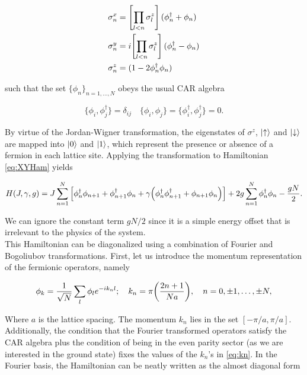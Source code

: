 \begin{align}
\sigma_n^x &= \qty[\prod_{l<n}\sigma^z_l](\phi_n^\dagger + \phi_n)\nonumber\\
\sigma_n^y &= i\qty[\prod_{l<n}\sigma^z_l](\phi_n^\dagger - \phi_n)\\
\sigma_n^z &= (1-2\phi_n^\dagger \phi_n )\nonumber
\end{align}


such that the set $\{\phi_n\}_{n=1,\ldots,N}$ obeys the usual CAR algebra

\begin{equation}
\{\phi_i, \phi_j^\dagger\}= \delta_{ij} \quad \{\phi_i, \phi_j\}=\{\phi_i^\dagger, \phi_j^\dagger\}=0.
\end{equation}

By virtue of the Jordan-Wigner transformation, the eigenstates of $\sigma^z$, $\ket{\uparrow}$ and $\ket{\downarrow}$ are mapped into $\ket{0}$ and $\ket{1}$, which represent the presence or absence of a fermion in each lattice site. Applying the transformation to Hamiltonian \eqref{eq:XYHam} yields

\begin{equation}
    H(J,\gamma,g) = J\sum_{n=1}^{N}\qty[\phi^\dagger_n  \phi_{n+1} + \phi^\dagger_{n+1}\phi_n + \gamma\qty(\phi_n^\dagger\phi^\dagger_{n+1} + \phi_{n+1}\phi_n)] + 2g\sum_{n=1}^{N}\phi_n^\dagger\phi_n - \frac{gN}{2}.
\end{equation}

We can ignore the constant term $gN/2$ since it is a simple energy offset that is irrelevant to the physics of the system.\\

 This Hamiltonian can be diagonalized using a combination of Fourier and Bogoliubov transformations. First, let us introduce the momentum representation of the fermionic operators, namely

\begin{equation}
\phi_k  = \frac{1}{\sqrt{N}}\sum_l \phi_l e^{-i k_n l};\quad k_n= \pi\qty(\frac{2n +1}{Na}),\quad n = 0,\pm 1,\ldots,\pm N, \label{eq:kn}
\end{equation}

Where $a$ is the lattice spacing. The momentum $k_n$ lies in the set $[-\pi/a , \pi/a]$. Additionally, the condition that the Fourier transformed operators satisfy the CAR algebra plus the condition of being in the even parity sector (as we are interested in the ground state) fixes the values of the $k_n$'s in \eqref{eq:kn}. In the Fourier basis, the Hamiltonian can be neatly written as the almost diagonal form

